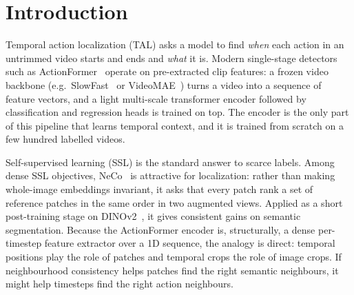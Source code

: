 \documentclass[10pt,a4paper]{article}
\begin{document}
\section{Introduction}

Temporal action localization (TAL) asks a model to find \emph{when} each action in an
untrimmed video starts and ends and \emph{what} it is. Modern single-stage detectors such
as ActionFormer~\cite{zhang2022actionformer} operate on pre-extracted clip features: a
frozen video backbone (e.g.\ SlowFast~\cite{feichtenhofer2019slowfast} or
VideoMAE~\cite{tong2022videomae}) turns a video into a sequence of feature vectors, and a
light multi-scale transformer encoder followed by classification and regression heads is
trained on top. The encoder is the only part of this pipeline that learns temporal
context, and it is trained from scratch on a few hundred labelled videos.

Self-supervised learning (SSL) is the standard answer to scarce labels. Among dense SSL
objectives, NeCo~\cite{pariza2025neco} is attractive for localization: rather than making
whole-image embeddings invariant, it asks that every patch rank a set of reference patches
in the same order in two augmented views. Applied as a short post-training stage on
DINOv2~\cite{oquab2024dinov2}, it gives consistent gains on semantic segmentation. Because
the ActionFormer encoder is, structurally, a dense per-timestep feature extractor over a
1D sequence, the analogy is direct: temporal positions play the role of patches and
temporal crops the role of image crops. If neighbourhood consistency helps patches find
the right semantic neighbours, it might help timesteps find the right action neighbours.
\end{document}
